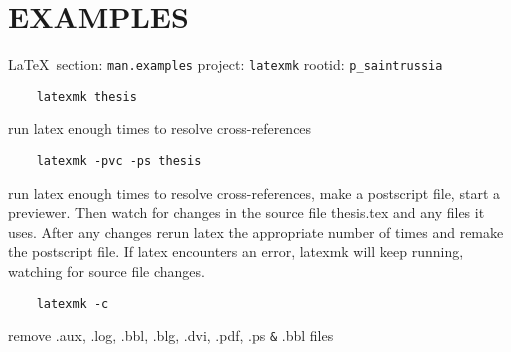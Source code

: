  
 

\section{EXAMPLES}
  
\vspace{0.5cm}
 {\ifDEBUG\small\LaTeX~section: \verb|man.examples| project: \verb|latexmk| rootid: \verb|p_saintrussia| \fi}
\vspace{0.5cm}

\begin{verbatim}
	latexmk thesis    
\end{verbatim}

run latex enough times to resolve cross-references

\begin{verbatim}
	latexmk -pvc -ps thesis
\end{verbatim}

run latex enough times to resolve
cross-references, make a postscript
file, start a previewer.  Then
watch for changes in the source
file thesis.tex and any files it
uses.  After any changes rerun latex
the appropriate number of times and
remake the postscript file.  If latex
encounters an error, latexmk will
keep running, watching for
source file changes.

\begin{verbatim}
	latexmk -c    
\end{verbatim}

remove .aux, .log, .bbl, .blg, .dvi, .pdf, .ps \verb|&| .bbl files


  
